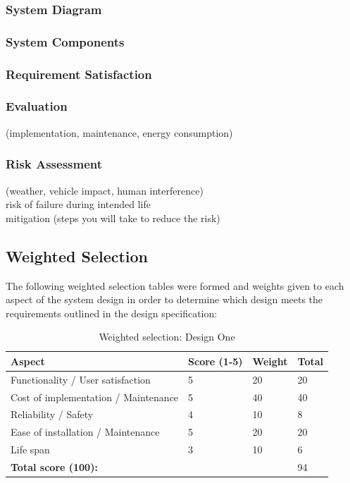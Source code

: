 \subsubsection{System Diagram}
\subsubsection{System Components}
\subsubsection{Requirement Satisfaction}

\subsubsection{Evaluation}
(implementation, maintenance, energy consumption) \\

\subsubsection{Risk Assessment}
(weather, vehicle impact, human interference) \\
risk of failure during intended life \\
mitigation (steps you will take to reduce the risk) \\

\newpage
\subsection{Weighted Selection}
The following weighted selection tables were formed and weights given to each aspect of the system design in order to determine which design meets the requirements outlined in the design specification:

\begin{table}[H]
\centering
\caption{Weighted selection: Design One\cite{handout}}
\label{my-label}
\begin{tabular}{l|l|l|l|}
\textbf{Aspect}                      & \textbf{Score (1-5)} & \textbf{Weight} & \textbf{Total} \\ \hline
Functionality / User satisfaction    & 5                     & 20                & 20               \\
Cost of implementation / Maintenance & 5                     & 40                & 40               \\
Reliability / Safety                 & 4                     & 10                & 8                \\
Ease of installation / Maintenance   & 5                     & 20                & 20               \\
Life span                            & 3                     & 10                & 6                \\ \hline
\textbf{Total score (100):}          &                       &                   & 94              
\end{tabular}
\end{table}

